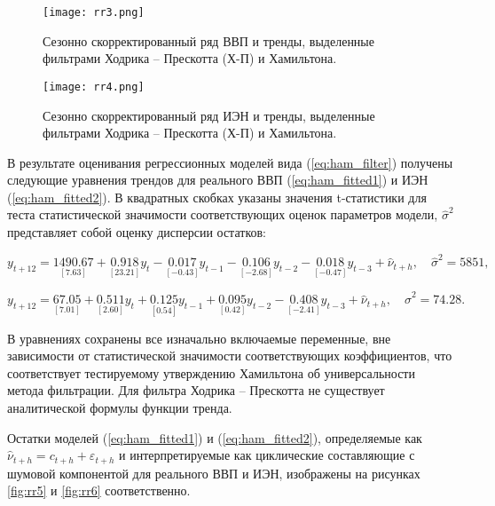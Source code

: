 \documentclass[a4paper,14pt]{extreport}
\begin{document}
	\begin{figure}
		\texttt{[image: rr3.png]}
		\caption{
			Сезонно скорректированный ряд ВВП и тренды, 
			выделенные фильтрами Ходрика -- Прескотта (Х-П) и Хамильтона. 
		}
		\label{fig:rr3}
	\end{figure}	

	\begin{figure}
		\texttt{[image: rr4.png]}
		\caption{
			Сезонно скорректированный ряд ИЭН и тренды, 
			выделенные фильтрами Ходрика -- Прескотта (Х-П) и Хамильтона.
		}
		\label{fig:rr4}
	\end{figure}	

	В результате оценивания регрессионных моделей вида (\ref{eq:ham_filter}) получены следующие уравнения трендов для реального ВВП (\ref{eq:ham_fitted1}) и ИЭН (\ref{eq:ham_fitted2}). В квадратных скобках указаны значения t-статистики для теста статистической значимости соответствующих оценок параметров модели, $\hat{\sigma}^2$ представляет собой оценку дисперсии остатков:
	
	\begin{equation}
		y_{t+12} = \underset{[7.63]}{1490.67} 
		+ \underset{[23.21]}{0.918} y_{t}
		- \underset{[-0.43]}{0.017} y_{t-1}
		- \underset{[-2.68]}{0.106} y_{t-2}
		- \underset{[-0.47]}{0.018} y_{t-3}
		+ \hat{\nu}_{t+h}, \quad \hat{\sigma}^2=5851 ,
		\label{eq:ham_fitted1}
	\end{equation}
	
	\begin{equation}
		y_{t+12} = \underset{[7.01]}{67.05} 
		+ \underset{[2.60]}{0.511} y_{t}
		+ \underset{[0.54]}{0.125} y_{t-1}
		+ \underset{[0.42]}{0.095} y_{t-2}
		- \underset{[-2.41]}{0.408} y_{t-3}
		+ \hat{\nu}_{t+h}, \quad \hat{\sigma}^2=74.28 .
		\label{eq:ham_fitted2}
	\end{equation}
	
	В уравнениях сохранены все изначально включаемые переменные, вне зависимости от статистической значимости соответствующих коэффициентов, что соответствует тестируемому утверждению Хамильтона об универсальности метода фильтрации. Для фильтра Ходрика -- Прескотта не существует аналитической формулы функции тренда.

	Остатки моделей (\ref{eq:ham_fitted1}) и (\ref{eq:ham_fitted2}), определяемые как $\hat{\nu}_{t+h} = c_{t+h} + \varepsilon_{t+h}$ и интерпретируемые как циклические составляющие с шумовой компонентой для реального ВВП и ИЭН, изображены на рисунках \ref{fig:rr5} и \ref{fig:rr6} соответственно.
	
\end{document}
